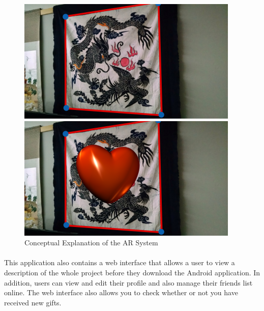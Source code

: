 \begin{figure}[H]
\centering
\begin{minipage}[t]{0.5\textwidth}
\includegraphics[width=.95\textwidth]{section01/assets/giftbox_1.png}
\end{minipage}%
\begin{minipage}[t]{0.5\textwidth}
\includegraphics[width=.95\textwidth]{section01/assets/giftbox_2.png}
\end{minipage}%
\caption[Sample Result 2]{Conceptual Explanation of the AR System}
\end{figure}

\paragraph{} This application also contains a web interface that allows a user to view a description of the whole project before they download the Android application. In addition, users can view and edit their profile and also manage their friends list online. The web interface also allows you to check whether or not you have received new gifts.